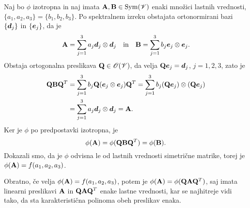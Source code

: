 \proof
	Naj bo $\phi$ izotropna in naj imata $\mathbf A,\mathbf B\in\mathrm{Sym}(\mathscr V)$
	enaki množici lastnih vrednosti, $\{a_1,a_2,a_3\}=\{b_1,b_2,b_3\}$.
	Po spektralnem izreku obstajata ortonormirani bazi $\{\boldsymbol d_j\}$ in $\{\boldsymbol e_j\}$,
	da je
	\[
		\mathbf A=\sum_{j=1}^3 a_j\boldsymbol d_j\otimes\boldsymbol d_j\quad\textrm{in}\quad
		\mathbf B=\sum_{j=1}^3 b_j\boldsymbol e_j\otimes\boldsymbol e_j.
	\]
	Obstaja ortogonalna preslikava $\mathbf Q\in\mathscr{O}(\mathscr V)$,
	da velja $\mathbf Q\boldsymbol e_j=\boldsymbol d_j$, $j=1,2,3$, zato je
	\begin{align*}
		\mathbf Q\mathbf B\mathbf Q^T&=\sum_{j=1}^3 b_j\mathbf Q(\boldsymbol e_j\otimes\boldsymbol e_j)\mathbf Q^T
		=\sum_{j=1}^3 b_j(\mathbf Q\boldsymbol e_j)\otimes(\mathbf Q\boldsymbol e_j) \\
		&=\sum_{j=1}^3 a_j\boldsymbol d_j\otimes\boldsymbol d_j=\mathbf A.
	\end{align*}
	Ker je $\phi$ po predpostavki izotropna, je
	\[
		\phi(\mathbf A)=\phi(\mathbf Q\mathbf B\mathbf Q^T)=\phi(\mathbf B).
	\]
	Dokazali smo, da je $\phi$ odvisna le od lastnih vrednosti simetrične matrike,
	torej je $\phi(\mathbf A)=f(a_1,a_2,a_3)$.
	
	Obratno, če velja $\phi(\mathbf A)=f(a_1,a_2,a_3)$, potem je $\phi(\mathbf A)=\phi(\mathbf Q\mathbf A\mathbf Q^T)$,
	saj imata linearni preslikavi $\mathbf A$ in $\mathbf Q\mathbf A\mathbf Q^T$ enake lastne vrednosti,
	kar se najhitreje vidi tako, da sta karakteristična polinoma obeh preslikav enaka.
\endproof

